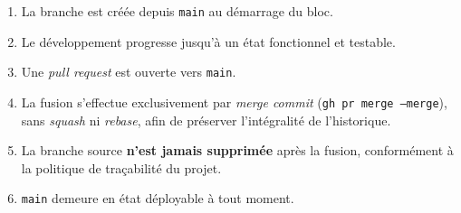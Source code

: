 \documentclass[12pt, a4paper]{article}
\begin{document}
\begin{enumerate}
  \item La branche est créée depuis \texttt{main} au démarrage du bloc.
  \item Le développement progresse jusqu'à un état fonctionnel et testable.
  \item Une \textit{pull request} est ouverte vers \texttt{main}.
  \item La fusion s'effectue exclusivement par \textit{merge commit}
        (\texttt{gh pr merge --merge}), sans \textit{squash} ni
        \textit{rebase}, afin de préserver l'intégralité de l'historique.
  \item La branche source \textbf{n'est jamais supprimée} après la fusion,
        conformément à la politique de traçabilité du projet.
  \item \texttt{main} demeure en état déployable à tout moment.
\end{enumerate}
\end{document}

